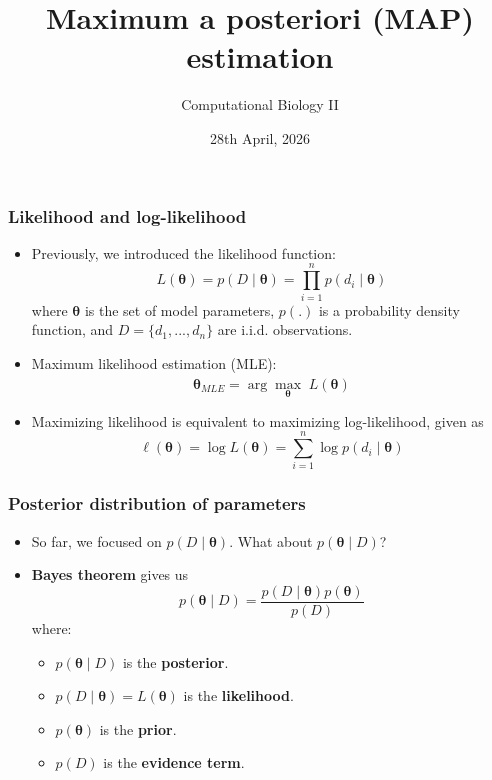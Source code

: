 \documentclass{beamer}
\title{Maximum a posteriori (MAP) estimation}
\author{Computational Biology II }
\date{28th April, 2026}
\begin{document}
	\frame{\titlepage}
	
	
	
	\begin{frame}
		\frametitle{Likelihood and log-likelihood}
		\begin{itemize}
			\item Previously, we introduced the likelihood function:
			$$
			L(\bm{\theta}) = p(D \mid \bm{\theta}) = \prod_{i=1}^{n} p(d_i \mid \bm{\theta})
			$$		
			where $\bm{\theta}$ is the set of model parameters, $p(.)$ is a probability density function, and $D = \{ d_1,...,d_n\}$ are i.i.d. observations.
			\pause
			\item Maximum likelihood estimation (MLE):
			$$
			\hat{\bm{\theta}}_{MLE} = \arg\max_{\bm{\theta}} \; L(\bm{\theta})
			$$
			\pause
			\item Maximizing likelihood is equivalent to maximizing log-likelihood, given as 
			$$
			\ell(\bm{\theta}) = \log L(\bm{\theta}) = \sum_{i=1}^{n} \log p(d_i \mid \bm{\theta})
			$$
		\end{itemize}
	
		
	\end{frame}	
	
	\begin{frame}
		\frametitle{Posterior distribution of parameters}
		\begin{itemize}
			\item So far, we focused on $p(D \mid \bm{\theta})$. What about $p(\bm{\theta} \mid D)$?
			\pause
			\item \textbf{Bayes theorem} gives us
			$$
			p(\bm{\theta} \mid D) = \frac{p(D \mid \bm{\theta}) p(\bm{\theta})}{p(D)}
			$$ 	
			where:
			\begin{itemize}
				\item $p(\bm{\theta} \mid D)$ is the \textbf{posterior}.
				\item $p(D \mid \bm{\theta}) = L(\bm{\theta}) $ is the \textbf{likelihood}.
				\item $p(\bm{\theta})$ is the \textbf{prior}.
				\item $p(D)$ is the \textbf{evidence term}.
			\end{itemize}		
		\end{itemize}
	\end{frame}	
	
\end{document}
